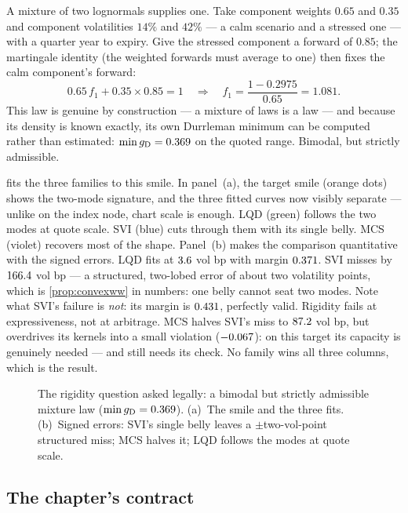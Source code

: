A mixture of two lognormals supplies one.  Take component weights
$0.65$ and $0.35$ and component volatilities $14\%$ and $42\%$ ---
a calm scenario and a stressed one --- with a quarter year to expiry.
Give the stressed component a forward of $0.85$; the martingale
identity (the weighted forwards must average to one) then fixes the
calm component's forward:
\[
0.65\,f_1+0.35\times0.85=1
\quad\Longrightarrow\quad
f_1=\frac{1-0.2975}{0.65}=1.081 .
\]
This law is genuine by construction --- a mixture of laws is a law ---
and because its density is known exactly, its own Durrleman minimum
can be computed rather than estimated: $\min g_{\rm
D}=0.369$ on the quoted range.  Bimodal, but strictly
admissible.

 fits the three families to this smile.  In
panel~(a), the target smile (orange dots) shows the two-mode
signature, and the three fitted curves now visibly separate --- unlike
on the index node, chart scale is enough.  LQD (green) follows the two
modes at quote scale.  SVI (blue) cuts through them with its single
belly.  MCS (violet) recovers most of the shape.  Panel~(b) makes the
comparison quantitative with the signed errors.  LQD fits at
$3.6$ vol bp with margin $0.371$.  SVI misses
by $166.4$ vol bp --- a structured, two-lobed error of
about two volatility points, which is \cref{prop:convexww} in numbers:
one belly cannot seat two modes.  Note what SVI's failure is
\emph{not}: its margin is $0.431$, perfectly valid.
Rigidity fails at expressiveness, not at arbitrage.  MCS halves SVI's
miss to $87.2$ vol bp, but overdrives its kernels into a
small violation ($-0.067$): on this target its capacity is
genuinely needed --- and still needs its check.  No family wins all
three columns, which is the result.

\begin{figure}[htbp]
\centering
{}
\caption{The rigidity question asked legally: a bimodal but strictly
admissible mixture law ($\min g_{\rm D}=0.369$).
(a)~The smile and the three fits.  (b)~Signed errors: SVI's single
belly leaves a $\pm$two-vol-point structured miss; MCS halves it; LQD
follows the modes at quote scale.}
\label{fig:cmpmixture}
\end{figure}

\subsection{The chapter's contract}

